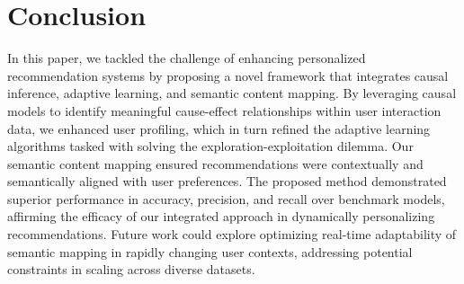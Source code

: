 \section{Conclusion}

In this paper, we tackled the challenge of enhancing personalized recommendation systems by proposing a novel framework that integrates causal inference, adaptive learning, and semantic content mapping. By leveraging causal models to identify meaningful cause-effect relationships within user interaction data, we enhanced user profiling, which in turn refined the adaptive learning algorithms tasked with solving the exploration-exploitation dilemma. Our semantic content mapping ensured recommendations were contextually and semantically aligned with user preferences. The proposed method demonstrated superior performance in accuracy, precision, and recall over benchmark models, affirming the efficacy of our integrated approach in dynamically personalizing recommendations. Future work could explore optimizing real-time adaptability of semantic mapping in rapidly changing user contexts, addressing potential constraints in scaling across diverse datasets.
